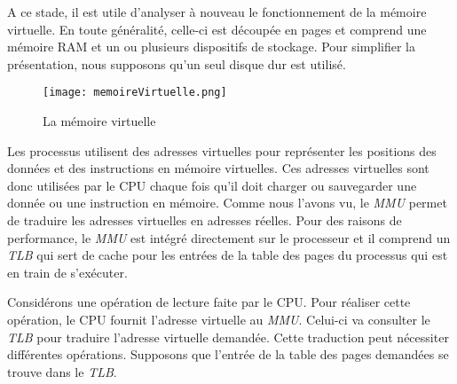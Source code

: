 A ce stade, il est utile d'analyser à nouveau le fonctionnement de la
mémoire virtuelle. En toute généralité, celle-ci est découpée en pages
et comprend une mémoire RAM et un ou plusieurs dispositifs de stockage.
Pour simplifier la présentation, nous supposons qu'un seul disque dur
est utilisé.\newline

\begin{figure}[!ht]
    \centering
    \texttt{[image: memoireVirtuelle.png]}
    \caption{La mémoire virtuelle}
\end{figure}

Les processus utilisent des adresses virtuelles pour représenter les
positions des données et des instructions en mémoire virtuelles. Ces
adresses virtuelles sont donc utilisées par le CPU chaque fois qu'il
doit charger ou sauvegarder une donnée ou une instruction en mémoire.
Comme nous l'avons vu, le \textit{MMU} permet de traduire les
adresses virtuelles en adresses réelles. Pour des raisons de
performance, le \textit{MMU} est intégré directement sur le
processeur et il comprend un \textit{TLB} qui sert de cache pour les
entrées de la table des pages du processus qui est en train de
s'exécuter.\newline
  
Considérons une opération de lecture faite par le CPU. Pour réaliser
cette opération, le CPU fournit l'adresse virtuelle au
\textit{MMU}. Celui-ci va consulter le \textit{TLB} pour traduire
l'adresse virtuelle demandée. Cette traduction peut nécessiter
différentes opérations. Supposons que l'entrée de la table des pages
demandées se trouve dans le \textit{TLB}.
  
